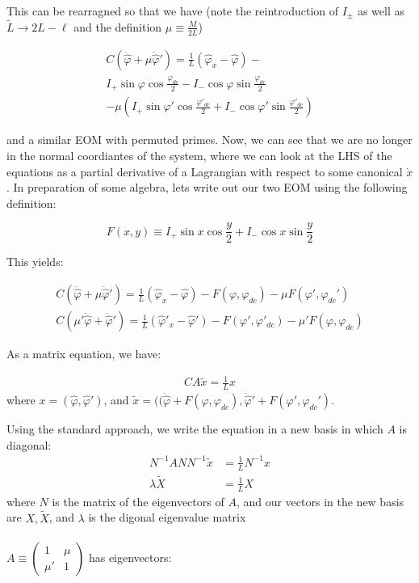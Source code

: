 \documentclass[paper=a4, twocolumn, fontsize=10pt]{article} %
\numberwithin{equation}{section} %
\numberwithin{figure}{section} %
\numberwithin{table}{section} %
\def \df#1{\hat{#1}}
\def \dl#1{#1}
\begin{document}
This can be rearragned so that we have (note the reintroduction of $I_{\pm}$ as well as $\tilde{L}\to 2L-\ell$ and the definition $\mu\equiv \frac{M}{2L}$)

\begin{multline}
    C \left(\ddot{\df\varphi}+ \mu \ddot{\df\varphi}' \right) = \frac{1}{L}\left( \df\varphi_x - \df\varphi \right) -  \\
    I_{+} \sin \dl\varphi \cos \frac{\dl\dl\varphi_{dc}}{2} - I_{-} \cos \dl\dl\varphi \sin \frac{\dl\dl\varphi_{dc}}{2} \\
    - \mu ( I_{+} \sin \dl\dl\varphi' \cos \frac{\dl\dl\varphi'_{dc}}{2} + I_{-} \cos \dl\dl\varphi' \sin \frac{\dl\dl\varphi'_{dc}}{2})
\end{multline}

and a similar EOM with permuted primes. Now, we can see that we are no longer in the normal coordiantes of the system, where we can look at the LHS of the equations as a partial derivative of a Lagrangian with respect to some canonical $\dot{x}$. In preparation of some algebra, lets write out our two EOM using the following definition:

\[ F(x,y) \equiv I_{+} \sin x \cos \frac{y}{2} + I_{-} \cos x \sin \frac{y}{2} \]

This yields:

\begin{align}
    C \left( \ddot{\df\varphi} + \mu \ddot{\df\varphi}'\right) = \frac{1}{L} (\df\varphi_x-\df\varphi) - F(\dl\varphi, \dl\varphi_{dc}) - \mu F(\dl\varphi',\dl\varphi_{dc}')
    \\
    C \left( \mu' \ddot{\df\varphi} + \ddot{\df\varphi}'\right) = \frac{1}{L} (\df\varphi'_x-\df\varphi') - F(\dl\varphi', \dl\varphi'_{dc}) - \mu' F(\dl\varphi,\dl\varphi_{dc})
\end{align}

As a matrix equation, we have:

\begin{align}{
    C A \tilde{x} = \frac{1}{L} x 
}
\end{align}
where $x = (\df\varphi, \df\varphi')$, and $\tilde{x} = ((\ddot{\df\varphi}+F(\dl\varphi, \dl\varphi_{dc}), \ddot{\df\varphi}' + F(\dl\varphi',\dl\varphi_{dc}')$.

Using the standard approach, we write the equation in a new basis in which $A$ is diagonal:
 \begin{align}
    N^{-1} A N N^{-1}  \tilde{x} &= \frac{1}{L} N^{-1} x \\
    \lambda \tilde{X} &= \frac{1}{L} X
\end{align}
where $N$ is the matrix of the eigenvectors of $A$, and our vectors in the new basis are $X,\tilde{X}$, and $\lambda$ is the digonal eigenvalue matrix
\\ \\
$A \equiv \begin{pmatrix} 1 & \mu \\ \mu' & 1 \end{pmatrix}  $ has eigenvectors:
\end{document}
